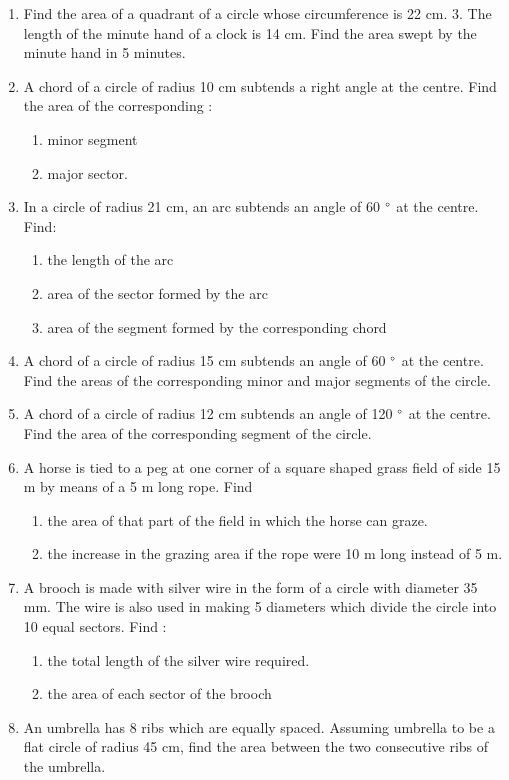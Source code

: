 \begin{enumerate}[label=\thesection.\arabic*.,ref=\thesection.\theenumi]
\item Find the area of a quadrant of a circle whose circumference is 22 cm. 3. The length of the minute hand of a clock is 14 cm. Find the area swept by the minute hand in 5 minutes.
\item A chord of a circle of radius 10 cm subtends a right angle at the centre. Find the area of the corresponding : 
\begin{enumerate}
\item minor segment 
\item major sector.
\end{enumerate}

\item In a circle of radius 21 cm, an arc subtends an angle of 60 $\degree$  at the centre. Find: 
\begin{enumerate}
\item the length of the arc 
\item area of the sector formed by the arc 
\item area of the segment formed by the corresponding chord
\end{enumerate}
\item A chord of a circle of radius 15 cm subtends an angle of 60 $\degree$  at the centre. Find the areas of the corresponding minor and major segments of the circle. 
\item A chord of a circle of radius 12 cm subtends an angle of 120 $\degree$  at the centre. Find the area of the corresponding segment of the circle. 
\item A horse is tied to a peg at one corner of a square shaped grass field of side 15 m by means of a 5 m long rope. Find 
\begin{enumerate}
\item the area of that part of the field in which the horse can graze.
\item the increase in the grazing area if the rope were 10 m long instead of 5 m.
\end{enumerate}
\item A brooch is made with silver wire in the form of a circle with diameter 35 mm. The wire is also used in making 5 diameters which divide the circle into 10 equal sectors. Find : 
\begin{enumerate}
\item the total length of the silver wire required. 
\item the area of each sector of the brooch
\end{enumerate}
\item An umbrella has 8 ribs which are equally spaced. Assuming umbrella to be a flat circle of radius 45 cm, find the area between the two consecutive ribs of the umbrella.

\end{enumerate}

